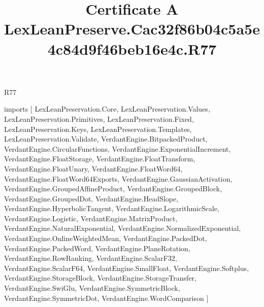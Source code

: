 \begin{lexlean}{R77}
\title{Certificate A LexLeanPreserve.Cac32f86b04c5a5e4c84d9f46beb16e4c.R77}
\begin{coremodule}
imports [
  LexLeanPreservation.Core,
  LexLeanPreservation.Values,
  LexLeanPreservation.Primitives,
  LexLeanPreservation.Fixed,
  LexLeanPreservation.Keys,
  LexLeanPreservation.Templates,
  LexLeanPreservation.Validate,
  VerdantEngine.BitpackedProduct,
  VerdantEngine.CircularFunctions,
  VerdantEngine.ExponentialIncrement,
  VerdantEngine.FloatStorage,
  VerdantEngine.FloatTransform,
  VerdantEngine.FloatUnary,
  VerdantEngine.FloatWord64,
  VerdantEngine.FloatWord64Exports,
  VerdantEngine.GaussianActivation,
  VerdantEngine.GroupedAffineProduct,
  VerdantEngine.GroupedBlock,
  VerdantEngine.GroupedDot,
  VerdantEngine.HeadSlope,
  VerdantEngine.HyperbolicTangent,
  VerdantEngine.LogarithmicScale,
  VerdantEngine.Logistic,
  VerdantEngine.MatrixProduct,
  VerdantEngine.NaturalExponential,
  VerdantEngine.NormalizedExponential,
  VerdantEngine.OnlineWeightedMean,
  VerdantEngine.PackedDot,
  VerdantEngine.PackedWord,
  VerdantEngine.PlaneRotation,
  VerdantEngine.RowRanking,
  VerdantEngine.ScalarF32,
  VerdantEngine.ScalarF64,
  VerdantEngine.SmallFloat,
  VerdantEngine.Softplus,
  VerdantEngine.StorageBlock,
  VerdantEngine.StorageTransfer,
  VerdantEngine.SwiGlu,
  VerdantEngine.SymmetricBlock,
  VerdantEngine.SymmetricDot,
  VerdantEngine.WordComparison
]


\end{coremodule}
\end{lexlean}
